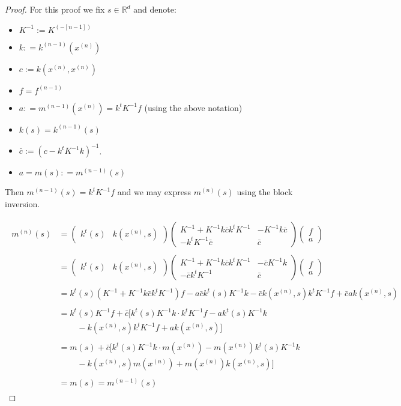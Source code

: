 \documentclass[paper=a4, fontsize=11pt]{scrartcl} %
\numberwithin{equation}{section} %
\numberwithin{figure}{section} %
\numberwithin{table}{section} %
\newcommand{\rr}{\mathbb{R}}
\newcommand{\bars}{ \ \ \ \ \ \ \ \ \ \ }
\newcommand{\xn}{x^{(n)}} %
\newcommand{\mn}{m^{(n)}}
\newcommand{\mnm}{m^{(n-1)}}
\newcommand{\fnm}{f^{(n-1)}}
\newcommand{\knm}{k^{(n-1)}}
\newcommand{\Kinvnm}{K^{(-[n-1])}}
\newcommand{\Kinv}{K^{-1}} %
\begin{document}
\begin{proof}
 For this proof we fix $s\in \rr ^{d}$ and denote:
\begin{itemize}
 \item $\Kinv := \Kinvnm$ 
 \item $k : = \knm(\xn)$
 \item $c := k(\xn,\xn)$
 \item $f = \fnm$ 
 \item $a : = \mnm(\xn) = k^t\Kinv f$ (using the above notation)
 \item $k(s) = \knm(s)$
 \item $\bar{c} := (c - k^t\Kinv k)^{-1}$. 
 \item $a = m(s) : = \mnm(s)$
\end{itemize}
Then $\mnm(s) = k^t\Kinv f$ and we may express $\mn(s)$ using the block inversion.


\begin{align}
 \begin{split}
%
\mn(s) &= \left( \begin{array}{cc}
 k^t(s)  & k(\xn, s)  
\end{array} \right)
%
%
\left( \begin{array}{cc}
\Kinv + \Kinv k \bar{c} k^t \Kinv  &  -\Kinv k \bar{c} \\
-k^t\Kinv \bar{c}   &  \bar{c}
 \end{array} \right)
%
%
\left( \begin{array}{cc}
 f  \\ a 
 \end{array} \right) \\\\
%
%
%
%
%
%
%
%
&= \left( \begin{array}{cc}
 k^t(s)  & k(\xn, s)
 \end{array} \right)
%
%
\left( \begin{array}{cc}
\Kinv + \Kinv k \bar{c} k^t \Kinv  &  -\bar{c}\Kinv k  \\
-\bar{c}k^t\Kinv   & \bar{c}
 \end{array} \right)
%
%
\left( \begin{array}{cc}
 f  \\ a
  \end{array} \right) \\\\
%
%
&=  k^t(s)(\Kinv + \Kinv k \bar{c}k^t \Kinv )f - a\bar{c} k^t(s) \Kinv k  -\bar{c} k(\xn,s) k^t\Kinv f + \bar{c}a k(\xn,s) \\\\
%
%
&=  k^t(s)\Kinv f + \bar{c}[k^t(s)\Kinv k\cdot  k^t \Kinv f - a k^t(s) \Kinv k \\
 &\bars - k(\xn, s) k^t\Kinv f + a k(\xn,s)] \\\\
%
%
%
&= m(s) + \bar{c}[k^t(s)\Kinv k\cdot  m (\xn) -m(\xn) k^t(s) \Kinv k \\
 &\bars - k(\xn, s) m(\xn) + m(\xn) k(\xn,s)] \\\\
%
%
%
& = m(s) = \mnm (s)
\end{split}
\end{align}
\end{proof}
\end{document}
